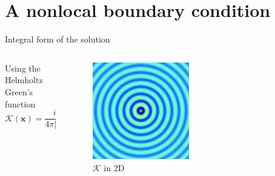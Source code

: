 \documentclass{beamer}
\begin{document}
\section{A nonlocal boundary condition}

\begin{frame}{Integral form of the solution}
    \begin{columns}
      \begin{column}{0.7\textwidth}
             Using the Helmholtz Green's function \[\mathcal K\left(\mathbf{x}\right)
                =\displaystyle\frac{i}{4\pi \left|\mathbf{x}\right|}
                \displaystyle e^{i\kappa\left|\mathbf{x}\right|},\]
      \end{column}
      \begin{column}{0.3\textwidth}
        \begin{figure}
        \begin{center}
          \includegraphics[width=0.5\textwidth]{images/2d_helmholtz_greens_function.png}
          \end{center}\caption{$\mathcal K$ in 2D}
          \end{figure}
      \end{column}
    \end{columns}

\end{frame}
\end{document}
